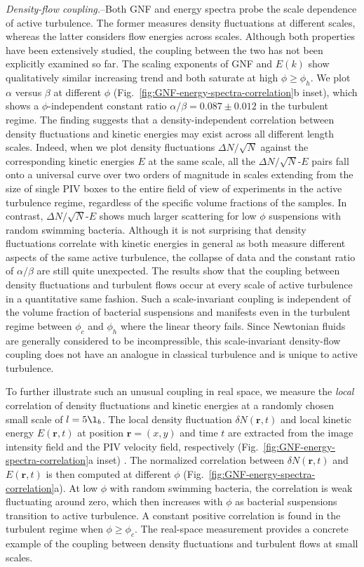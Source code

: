 \documentclass[twocolumn,aps,prl,amsmath,amssymb,longbibliography]{revtex4-2}
\begin{document}
\textit{Density-flow coupling.}--Both GNF and energy spectra probe the scale dependence of active turbulence. The former measures density fluctuations at different scales, whereas the latter considers flow energies across scales. Although both properties have been extensively studied, the coupling between the two has not been explicitly examined so far. The scaling exponents of GNF and $E(k)$ show qualitatively similar increasing trend and both saturate at high $\phi \geq \phi_h$. We plot $\alpha$ versus $\beta$ at different $\phi$ (Fig.~\ref{fig:GNF-energy-spectra-correlation}b inset), which shows a $\phi$-independent constant ratio $\alpha/\beta = 0.087 \pm 0.012$ in the turbulent regime. The finding suggests that a density-independent correlation between density fluctuations and kinetic energies may exist across all different length scales. Indeed, when we plot density fluctuations $\Delta N/\sqrt N$ against the corresponding kinetic energies $E$ at the same scale, all the $\Delta N/\sqrt N$-$E$ pairs fall onto a universal curve over two orders of magnitude in scales extending from the size of single PIV boxes to the entire field of view of experiments in the active turbulence regime, regardless of the specific volume fractions of the samples. In contrast, $\Delta N/\sqrt N$-$E$ shows much larger scattering for low $\phi$ suspensions with random swimming bacteria. Although it is not surprising that density fluctuations correlate with kinetic energies in general as both measure different aspects of the same active turbulence, the collapse of data and the constant ratio of $\alpha/\beta$ are still quite unexpected. The results show that the coupling between density fluctuations and turbulent flows occur at every scale of active turbulence in a quantitative same fashion. Such a scale-invariant coupling is independent of the volume fraction of bacterial suspensions and manifests even in the turbulent regime between $\phi_c$ and $\phi_h$ where the linear theory fails. Since Newtonian fluids are generally considered to be incompressible, this scale-invariant density-flow coupling does not have an analogue in classical turbulence and is unique to active turbulence.

To further illustrate such an unusual coupling in real space, we measure the \emph{local} correlation of density fluctuations and kinetic energies at a randomly chosen small scale of $l = 5\l_b$. The local density fluctuation $\delta N(\mathbf{r},t)$ and local kinetic energy $E(\mathbf{r},t)$ at position $\mathbf{r} = (x,y)$ and time $t$ are extracted from the image intensity field and the PIV velocity field, respectively (Fig.~\ref{fig:GNF-energy-spectra-correlation}a inset) \cite{Liu2020}. The normalized correlation between $\delta N(\mathbf{r},t)$ and $E(\mathbf{r},t)$ is then computed at different $\phi$ (Fig.~\ref{fig:GNF-energy-spectra-correlation}a). At low $\phi$ with random swimming bacteria, the correlation is weak fluctuating around zero, which then increases with $\phi$ as bacterial suspensions transition to active turbulence. A constant positive correlation is found in the turbulent regime when $\phi \geq \phi_c$. The real-space measurement provides a concrete example of the coupling between density fluctuations and turbulent flows at small scales.
\end{document}
